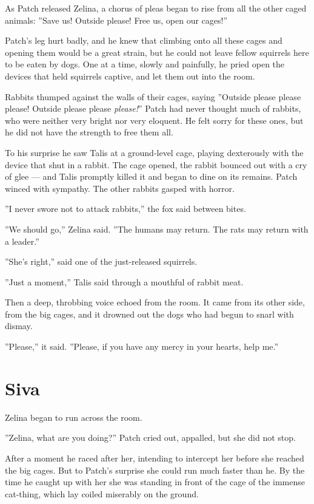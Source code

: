 \documentclass[12pt]{book}
\begin{document}
As Patch released Zelina, a chorus of pleas began to rise from all the
other caged animals: ''Save us! Outside please! Free us, open our
cages!''

Patch's leg hurt badly, and he knew that climbing onto all these cages
and opening them would be a great strain, but he could not leave
fellow squirrels here to be eaten by dogs. One at a time, slowly and
painfully, he pried open the devices that held squirrels captive, and
let them out into the room.

Rabbits thumped against the walls of their cages, saying ''Outside
please please please! Outside please please \textit{please!}'' Patch
had never thought much of rabbits, who were neither very bright nor
very eloquent. He felt sorry for these ones, but he did not have the
strength to free them all.

To his surprise he saw Talis at a ground-level cage, playing
dexterously with the device that shut in a rabbit. The cage opened,
the rabbit bounced out with a cry of glee --- and Talis promptly
killed it and began to dine on its remains. Patch winced with
sympathy. The other rabbits gasped with horror.

''I never swore not to attack rabbits,'' the fox said between bites.

''We should go,'' Zelina said. ''The humans may return. The rats may
return with a leader.''

''She's right,'' said one of the just-released squirrels.

''Just a moment,'' Talis said through a mouthful of rabbit meat.

Then a deep, throbbing voice echoed from the room. It came from its
other side, from the big cages, and it drowned out the dogs who had
begun to snarl with dismay.

''Please,'' it said. ''Please, if you have any mercy in your hearts,
help me.''


\section{Siva}

Zelina began to run across the room.

''Zelina, what are you doing?'' Patch cried out, appalled, but she did
not stop.

After a moment he raced after her, intending to intercept her before
she reached the big cages. But to Patch's surprise she could run much
faster than he. By the time he caught up with her she was standing in
front of the cage of the immense cat-thing, which lay coiled miserably
on the ground.
\end{document}

